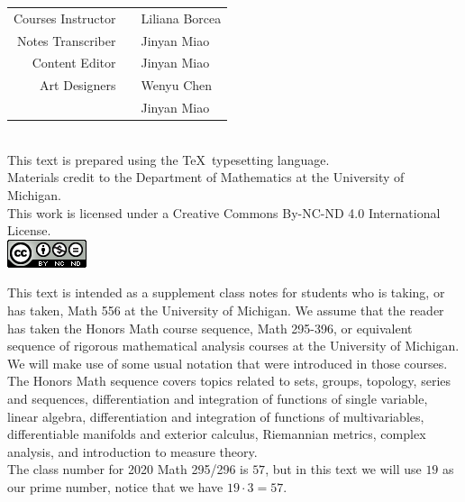 \documentclass[11pt]{book}
\theoremstyle{break}
\theoremstyle{break}
\begin{document}
\newpage 
\tableofcontents
{}

\newpage
\setcounter{page}{1}
\vspace*{\fill}




\begin{center}
\begin{tabular}{rcl}
Courses Instructor & & Liliana Borcea \medskip
\\
Notes Transcriber & & Jinyan Miao\medskip
\\
Content Editor & & Jinyan Miao \medskip
\\
Art Designers & & Wenyu Chen \\
 & & Jinyan Miao \bigskip
\end{tabular} \\
This text is prepared using the \TeX\ typesetting language. \\
Materials  credit to the Department of Mathematics at the University of Michigan.\\
This work is licensed under a Creative Commons By-NC-ND 4.0 International License.  \\
\medskip
\includegraphics[scale=0.8]{cclisence.png}
\end{center}

\newpage
\vspace*{1.5cm}
\vspace*{\fill}
This text is intended as a supplement class notes for students who is taking, or has taken, Math 556 at the University of Michigan. We assume that the reader has taken the Honors Math course sequence, Math 295-396, or equivalent sequence of rigorous mathematical analysis courses at the University of Michigan. We will make use of some usual notation that were introduced in those courses. The Honors Math sequence covers topics related to sets, groups, topology, series and sequences, differentiation and integration of functions of single variable, linear algebra, differentiation and integration of functions of multivariables, differentiable manifolds and exterior calculus, Riemannian metrics, complex analysis, and introduction to measure theory.\\

The class number for 2020 Math 295/296 is $57$, but in this text we will use $19$ as our prime number, notice that we have $19\cdot 3 = 57$.\\
\end{document}
